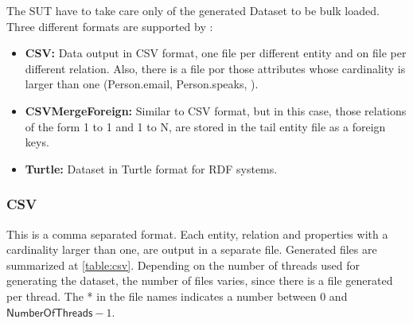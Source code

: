 The SUT have to take care only of the generated Dataset to be bulk loaded.
Three different formats are supported by \datagen:

\begin{itemize}
  \item \textbf{CSV:} Data output in CSV format, one file per different entity and on file
    per different relation. Also, there is a file por those attributes whose
    cardinality is larger than one (\ie Person.email, Person.speaks, \etc).
  \item \textbf{CSVMergeForeign:} Similar to CSV format, but in this case, those
    relations of the form 1 to 1 and 1 to N, are stored in the tail entity file as
    a foreign keys.
  \item \textbf{Turtle:} Dataset in Turtle format for RDF systems.
\end{itemize}



\subsubsection{CSV}

This is a comma separated format. Each entity, relation and properties with a
cardinality larger than one, are output in a separate file. Generated files are
summarized at \autoref{table:csv}.  Depending on the number of threads used
for generating the dataset, the number of files varies, since there is a file
generated per thread. The * in the file names indicates a number between 0 and
$\mathsf{NumberOfThreads}-1$.

